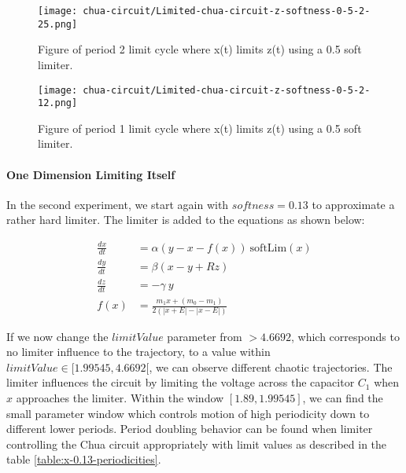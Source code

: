 \documentclass[main]{subfiles}
\begin{document}
\begin{figure}[H]
\centering
\texttt{[image: chua-circuit/Limited-chua-circuit-z-softness-0-5-2-25.png]}
\caption[Figure of period 3 limit cycle using a 0.5 soft limiter.]{Figure of period 2 limit cycle where x(t) limits z(t) using a 0.5 soft limiter.}
\label{figure:z-0.5-2-limit-cycle-trajectory}
\end{figure}

\begin{figure}[H]
\centering
\texttt{[image: chua-circuit/Limited-chua-circuit-z-softness-0-5-2-12.png]}
\caption[Figure of period 1 limit cycle using a 0.5 soft limiter.]{Figure of period 1 limit cycle where x(t) limits z(t) using a 0.5 soft limiter.}
\label{figure:z-0.5-1-limit-cycle-trajectory}
\end{figure}

\paragraph{One Dimension Limiting Itself} In the second experiment, we start again with \(softness=0.13\) to approximate a rather hard limiter. The limiter is added to the equations as shown below:

\begin{align*}
\frac{dx}{dt}&=\alpha (y-x-f(x)) ~ \text{softLim}(x)\\
\frac{dy}{dt}&=\beta (x-y + Rz)\\
\frac{dz}{dt}&=-\gamma ~ y\\
f (x) &= \frac{m_1 x + (m_0 - m_1)}{2 (| x + E | -| x - E |)}
\end{align*}

If we now change the $limitValue$ parameter from \(>4.6692\), which corresponds to no limiter influence to the trajectory, to a value within \(limitValue \in [1.99545,4.6692[\), we can observe different chaotic trajectories. The limiter influences the circuit by limiting the voltage across the capacitor \(C_1\) when \(x\) approaches the limiter. %
%
Within the window \([1.89,1.99545]\), we can find the small parameter window which controls motion of high periodicity down to different lower periods. %
%
Period doubling behavior can be found when limiter controlling the Chua circuit appropriately with limit values as described in the table \ref{table:x-0.13-periodicities}.
\end{document}
